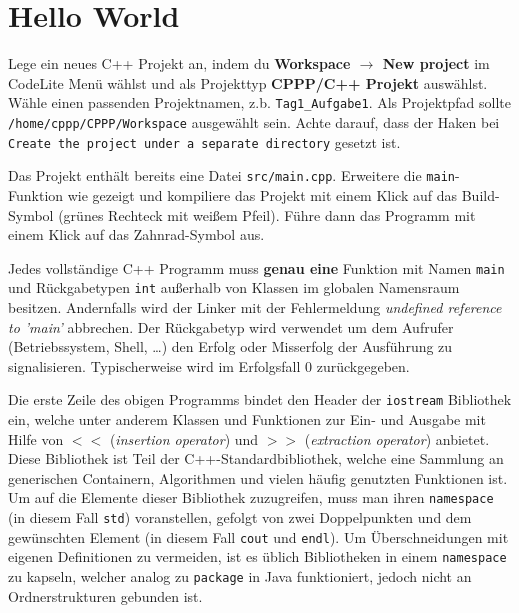 \section{Hello World}
Lege ein neues C++ Projekt an, indem du \textbf{Workspace $\rightarrow$ New project} im CodeLite Menü wählst und als Projekttyp \textbf{CPPP/C++ Projekt} auswählst.
Wähle einen passenden Projektnamen, z.b. \texttt{Tag1\_Aufgabe1}. Als Projektpfad sollte \texttt{/home/cppp/CPPP/Workspace} ausgewählt sein. Achte darauf, dass der Haken bei \texttt{Create the project under a separate directory} gesetzt ist.

Das Projekt enthält bereits eine Datei \texttt{src/main.cpp}. Erweitere die \texttt{main}-Funktion wie gezeigt und kompiliere das Projekt mit einem Klick auf das Build-Symbol (grünes Rechteck mit weißem Pfeil). Führe dann das Programm mit einem Klick auf das Zahnrad-Symbol aus.

\begin{minipage}{\textwidth} 
	
\end{minipage}

Jedes vollständige C++ Programm muss \textbf{genau eine} Funktion mit Namen \lstinline{main} und Rückgabetypen \lstinline{int} außerhalb von Klassen im globalen Namensraum besitzen.
Andernfalls wird der Linker mit der Fehlermeldung \emph{undefined reference to 'main'} abbrechen.
Der Rückgabetyp wird verwendet um dem Aufrufer (Betriebssystem, Shell, \dots) den Erfolg oder Misserfolg der Ausführung zu signalisieren.
Typischerweise wird im Erfolgsfall 0 zurückgegeben.

Die erste Zeile des obigen Programms bindet den Header der \lstinline{iostream} Bibliothek ein, welche unter anderem Klassen und Funktionen zur Ein- und Ausgabe mit Hilfe von $<<$ (\emph{insertion operator}) und $>>$ (\emph{extraction operator}) anbietet.
Diese Bibliothek ist Teil der C++-Standardbibliothek, welche eine Sammlung an generischen Containern, Algorithmen und vielen häufig genutzten Funktionen ist.
Um auf die Elemente dieser Bibliothek zuzugreifen, muss man ihren \lstinline{namespace} (in diesem Fall \lstinline{std}) voranstellen, gefolgt von zwei Doppelpunkten und dem gewünschten Element (in diesem Fall \lstinline{cout} und \lstinline{endl}).
Um Überschneidungen mit eigenen Definitionen zu vermeiden, ist es üblich Bibliotheken in einem \lstinline{namespace} zu kapseln, welcher analog zu \lstinline{package} in Java funktioniert, jedoch nicht an Ordnerstrukturen gebunden ist.

